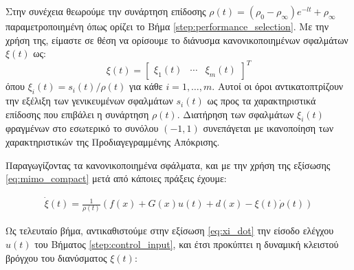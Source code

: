 Στην συνέχεια θεωρούμε την συνάρτηση επίδοσης $\rho(t) = ( \rho_0 - \rho_{\infty} ) e^{-l t} + \rho_{\infty}$ παραμετροποιημένη όπως ορίζει το Βήμα \ref{step:performance_selection}. Με την χρήση της, είμαστε σε θέση να ορίσουμε το διάνυσμα κανονικοποιημένων σφαλμάτων $\xi(t)$ ως:
\begin{equation*}
\xi(t) = 
\begin{bmatrix}
\xi_1(t) & \cdots & \xi_m(t)
\end{bmatrix}^T
\end{equation*}
όπου $\xi_i(t) = s_i(t)/\rho(t)$ για κάθε $i = 1,\dots,m$. Αυτοί οι όροι αντικατοπτρίζουν την εξέλιξη των γενικευμένων σφαλμάτων $s_i(t)$ ως προς τα χαρακτηριστικά επίδοσης που επιβάλει η συνάρτηση $\rho(t)$. Διατήρηση των σφαλμάτων $\xi_i(t)$ φραγμένων στο εσωτερικό το συνόλου $(-1,1)$ συνεπάγεται με ικανοποίηση των χαρακτηριστικών της Προδιαγεγραμμένης Απόκρισης.




Παραγωγίζοντας τα κανονικοποιημένα σφάλματα, και με την χρήση της εξίσωσης \eqref{eq:mimo_compact} μετά από κάποιες πράξεις έχουμε:

\begin{equation}
\begin{split}
\dot{\xi}(t) = \frac{1}{\rho(t)} \left( f(x) + G(x)u(t) + d(x) - \xi(t)\dot{\rho}(t)\right)
\end{split}
\label{eq:xi_dot}
\end{equation}

Ως τελευταίο βήμα, αντικαθιστούμε στην εξίσωση \eqref{eq:xi_dot} την είσοδο ελέγχου $u(t)$ του Βήματος \ref{step:control_input}, και έτσι προκύπτει η δυναμική κλειστού βρόγχου του διανύσματος $\xi(t)$:

